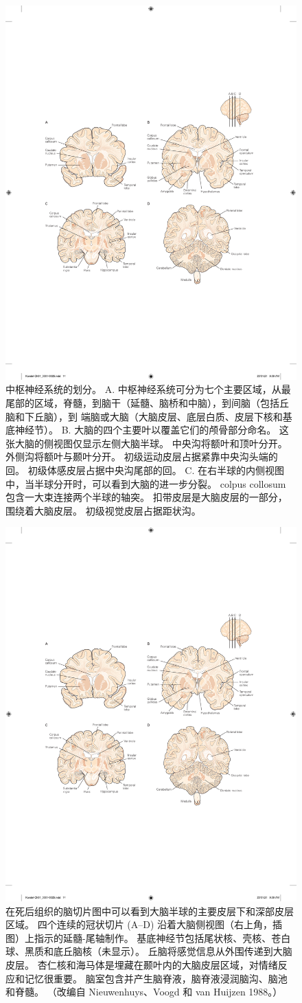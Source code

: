 \begin{figure}[htbp]
	\centering
	\includegraphics[width=0.5\linewidth]{chap01/fig_1_4}
	\caption{中枢神经系统的划分。 
		A. 中枢神经系统可分为七个主要区域，从最尾部的区域，脊髓，到脑干（延髓、脑桥和中脑），到间脑（包括丘脑和下丘脑），到 端脑或大脑（大脑皮层、底层白质、皮层下核和基底神经节）。 
		B. 大脑的四个主要叶以覆盖它们的颅骨部分命名。 
		这张大脑的侧视图仅显示左侧大脑半球。 中央沟将额叶和顶叶分开。 
		外侧沟将额叶与颞叶分开。 
		初级运动皮层占据紧靠中央沟头端的回。 
		初级体感皮层占据中央沟尾部的回。 
		C. 在右半球的内侧视图中，当半球分开时，可以看到大脑的进一步分裂。
		colpus collosum 包含一大束连接两个半球的轴突。 
		扣带皮层是大脑皮层的一部分，围绕着大脑皮层。 
		初级视觉皮层占据距状沟。}
	\label{fig:1_3}
\end{figure}

\begin{figure}[htbp]
	\centering
	\includegraphics[width=0.5\linewidth]{chap01/fig_1_4}
	\caption{在死后组织的脑切片图中可以看到大脑半球的主要皮层下和深部皮层区域。 
		四个连续的冠状切片 (A–D) 沿着大脑侧视图（右上角，插图）上指示的延髓-尾轴制作。 
		基底神经节包括尾状核、壳核、苍白球、黑质和底丘脑核（未显示）。 
		丘脑将感觉信息从外围传递到大脑皮层。 
		杏仁核和海马体是埋藏在颞叶内的大脑皮层区域，对情绪反应和记忆很重要。 
		脑室包含并产生脑脊液，脑脊液浸润脑沟、脑池和脊髓\cite{nieuwenhuys2007human}。 （改编自 Nieuwenhuys、Voogd 和 van Huijzen 1988。）}
	\label{fig:1_4}
\end{figure}


